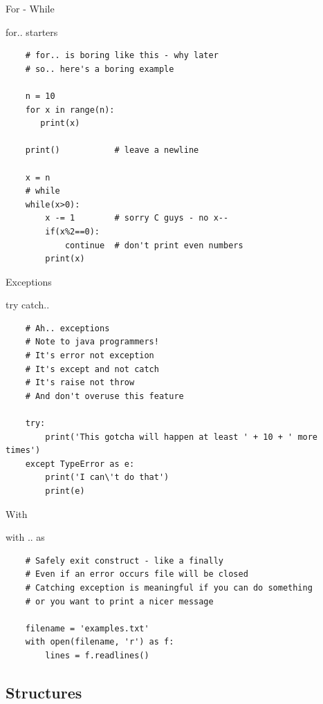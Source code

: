 \documentclass{bredelebeamer}
\begin{document}
\begin{frame}[fragile]{For - While}
  \begin{exampleblock}{for.. starters}
    \begin{lstlisting}
    # for.. is boring like this - why later
    # so.. here's a boring example
    
    n = 10
    for x in range(n):
       print(x)
       
    print()           # leave a newline
    
    x = n
    # while
    while(x>0):
        x -= 1        # sorry C guys - no x--
        if(x%2==0):
            continue  # don't print even numbers
        print(x)
    \end{lstlisting}
  \end{exampleblock}
\end{frame}

\begin{frame}[fragile]{Exceptions}
  \begin{exampleblock}{try catch..}
    \begin{lstlisting}
    # Ah.. exceptions
    # Note to java programmers!
    # It's error not exception
    # It's except and not catch
    # It's raise not throw
    # And don't overuse this feature
    
    try:
        print('This gotcha will happen at least ' + 10 + ' more times')
    except TypeError as e:
        print('I can\'t do that')
        print(e)
    \end{lstlisting}
  \end{exampleblock}
\end{frame}

\begin{frame}[fragile]{With}
  \begin{exampleblock}{with .. as}
    \begin{lstlisting}
    # Safely exit construct - like a finally
    # Even if an error occurs file will be closed
    # Catching exception is meaningful if you can do something
    # or you want to print a nicer message
    
    filename = 'examples.txt'
    with open(filename, 'r') as f:
        lines = f.readlines()
    \end{lstlisting}
  \end{exampleblock}
\end{frame}

\subsection{Structures}
\end{document}

